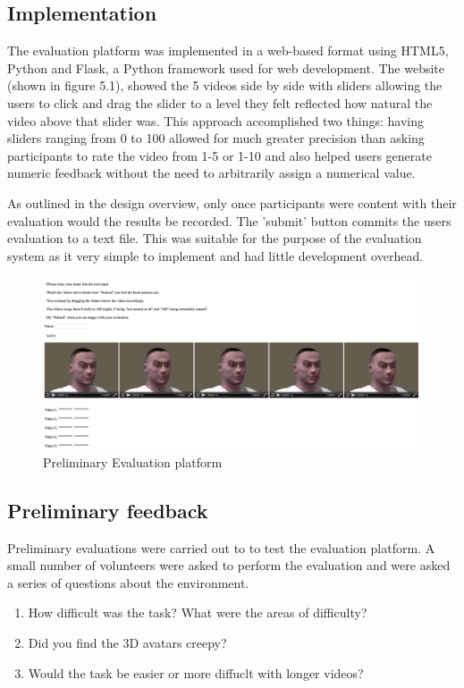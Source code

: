 \documentclass[bsc,frontabs,twoside,singlespacing,parskip,deptreport]{infthesis}
\begin{document}
\subsection{Implementation}

The evaluation platform was implemented in a web-based format using HTML5, Python and Flask, a Python framework used for web development. The website (shown in figure 5.1), showed the 5 videos side by side with sliders allowing the users to click and drag the slider to a level they felt reflected how natural the video above that slider was. This approach accomplished two things: having sliders ranging from 0 to 100 allowed for much greater precision than asking participants to rate the video from 1-5 or 1-10 and also helped users generate numeric feedback without the need to arbitrarily assign a numerical value.

As outlined in the design overview, only once participants were content with their evaluation would the results be recorded. The 'submit' button commits the users evaluation to a text file. This was suitable for the purpose of the evaluation system as it very simple to implement and had little development overhead.

\begin{figure}
	\centering
	\includegraphics[width=1.1\textwidth]{eval.png}
	\caption{Preliminary Evaluation platform}
\end{figure}

\subsection{Preliminary feedback}

Preliminary evaluations were carried out to to test the evaluation platform. A small number of volunteers were asked to perform the evaluation and were asked a series of questions about the environment.

\begin{enumerate}
\item{How difficult was the task? What were the areas of difficulty?}
\item{Did you find the 3D avatars creepy?}
\item{Would the task be easier or more diffuclt with longer videos?}
\end{enumerate}
\end{document}
